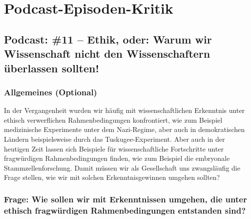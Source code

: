\documentclass[twoside, a4paper, DIV=11, open=any, bibliography=totoc]{scrbook}
\begin{document}
\chapter{Podcast-Episoden-Kritik} \label{chap:podkrit}


\section{Podcast: \#11 -- Ethik, oder: Warum wir Wissenschaft nicht den Wissenschaftern überlassen sollten!}

\subsection{Allgemeines (Optional)}

In der Vergangenheit wurden wir häufig mit wissenschaftlichen Erkenntnis unter
ethisch verwerflichen Rahmenbedingungen konfrontiert, wie zum Beispiel medizinische
Experimente unter dem Nazi-Regime, aber auch in demokratischen Ländern beispielsweise durch das Tuskugee-Experiment.
Aber auch in der heutigen Zeit lassen sich Beispiele für wissenschaftliche Fortschritte
unter fragwürdigen Rahmenbedingungen finden, wie zum Beispiel die embryonale Stammzellenforschung.
Damit müssen wir als Gesellschaft uns zwangsläufig die Frage stellen, wie wir mit solchen Erkenntnisgewinnen
umgehen sollten?

%

\subsection{Frage: Wie sollen wir mit Erkenntnissen umgehen, die unter ethisch fragwürdigen Rahmenbedingungen entstanden sind?}
\end{document}
